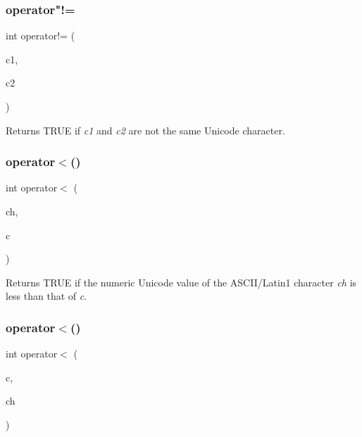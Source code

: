 \subsubsection{\texorpdfstring{operator"!=}{operator!=}\hspace{0.1cm}{\footnotesize\ttfamily [3/3]}}
{\footnotesize\ttfamily int operator!= (\begin{DoxyParamCaption}\item[{\mbox{\hyperlink{class_q_char}{Q\+Char}}}]{c1,  }\item[{\mbox{\hyperlink{class_q_char}{Q\+Char}}}]{c2 }\end{DoxyParamCaption})\hspace{0.3cm}{\ttfamily [friend]}}

Returns T\+R\+UE if {\itshape c1} and {\itshape c2} are not the same Unicode character. \mbox{\label{class_q_char_a1337fd200b0e581e8ac7f54460bbbc39}} 
\subsubsection{\texorpdfstring{operator$<$()}{operator<()}\hspace{0.1cm}{\footnotesize\ttfamily [1/3]}}
{\footnotesize\ttfamily int operator$<$ (\begin{DoxyParamCaption}\item[{char}]{ch,  }\item[{\mbox{\hyperlink{class_q_char}{Q\+Char}}}]{c }\end{DoxyParamCaption})\hspace{0.3cm}{\ttfamily [related]}}

Returns T\+R\+UE if the numeric Unicode value of the A\+S\+C\+I\+I/\+Latin1 character {\itshape ch} is less than that of {\itshape c}. \mbox{\label{class_q_char_a71f5a053f96ceccb5a6cbeb88a164235}} 
\subsubsection{\texorpdfstring{operator$<$()}{operator<()}\hspace{0.1cm}{\footnotesize\ttfamily [2/3]}}
{\footnotesize\ttfamily int operator$<$ (\begin{DoxyParamCaption}\item[{\mbox{\hyperlink{class_q_char}{Q\+Char}}}]{c,  }\item[{char}]{ch }\end{DoxyParamCaption})\hspace{0.3cm}{\ttfamily [related]}}

